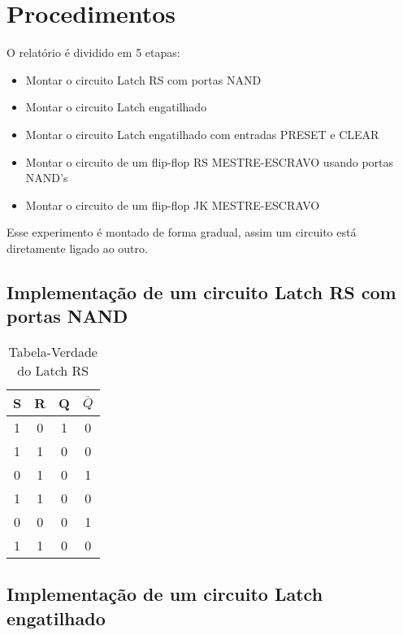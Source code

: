 \documentclass[12pt]{article}
\begin{document}
\section{Procedimentos}
\label{sec:Procedimentos}

O relatório é dividido em 5 etapas:

\begin{itemize}
	\item Montar o circuito Latch RS com portas NAND
	\item Montar o circuito Latch engatilhado
	\item Montar o circuito Latch engatilhado com entradas PRESET e CLEAR
	\item Montar o circuito de um flip-flop RS MESTRE-ESCRAVO usando portas NAND’s
	\item Montar o circuito de um flip-flop JK MESTRE-ESCRAVO
\end{itemize}

Esse experimento é montado de forma gradual, assim um circuito está diretamente ligado ao outro.

\subsection{Implementação de um circuito Latch RS com portas NAND}
\label{2.1}

\begin{table}[H]
	\centering
	\begin{tabular}{|c|c|c|c|}
		\cline{1-4}
		\caption{Tabela-Verdade do Latch RS}
		\multicolumn{1}{|c|}{S} & \multicolumn{1}{|c|}{R} & \multicolumn{1}{|c|}{Q} & \multicolumn{1}{|c|}{$\overline{Q}$} \\
		\hline
		1 & 0 & 1 & 0  \\
		\hline
		1 & 1 & 0 & 0 \\
		\hline
		0 & 1 & 0 & 1  \\
		\hline
		1 & 1 & 0 & 0  \\
		\hline
		0 & 0 & 0 & 1  \\
		\hline
		1 & 1 & 0 & 0  \\
		\hline
	\end{tabular}
	
\end{table} 

\subsection{Implementação de um circuito Latch engatilhado}
\label{2.2}
\end{document}
